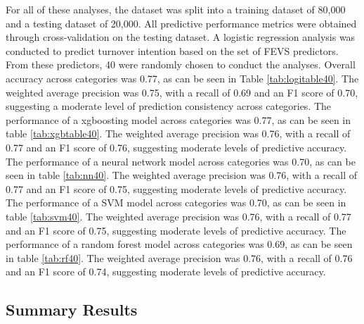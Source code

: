 \documentclass[
  man]{apa7}
\begin{document}
For all of these analyses, the dataset was split into a training dataset of 80,000 and a testing dataset of 20,000. All predictive performance metrics were obtained through cross-validation on the testing dataset. A logistic regression analysis was conducted to predict turnover intention based on the set of FEVS predictors. From these predictors, 40 were randomly chosen to conduct the analyses. Overall accuracy across categories was 0.77, as can be seen in Table \ref{tab:logitable40}. The weighted average precision was 0.75, with a recall of 0.69 and an F1 score of 0.70, suggesting a moderate level of prediction consistency across categories.
The performance of a xgboosting model across categories was 0.77, as can be seen in table \ref{tab:xgbtable40}. The weighted average precision was 0.76, with a recall of 0.77 and an F1 score of 0.76, suggesting moderate levels of predictive accuracy.
The performance of a neural network model across categories was 0.70, as can be seen in table \ref{tab:nn40}. The weighted average precision was 0.76, with a recall of 0.77 and an F1 score of 0.75, suggesting moderate levels of predictive accuracy.
The performance of a SVM model across categories was 0.70, as can be seen in table \ref{tab:svm40}. The weighted average precision was 0.76, with a recall of 0.77 and an F1 score of 0.75, suggesting moderate levels of predictive accuracy.
The performance of a random forest model across categories was 0.69, as can be seen in table \ref{tab:rf40}. The weighted average precision was 0.76, with a recall of 0.76 and an F1 score of 0.74, suggesting moderate levels of predictive accuracy.

\hypertarget{summary-results}{%
\subsection{Summary Results}\label{summary-results}}
\end{document}
